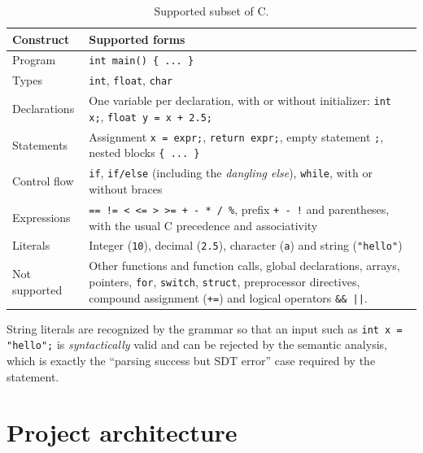 \documentclass[11pt,letterpaper]{article}
\let\oldsection\section
\renewcommand{\section}{\needspace{8\baselineskip}\oldsection}
\begin{document}
\begin{table}[!htbp]
\centering
\caption{Supported subset of C.}
\label{tab:scope}
\begin{tabularx}{\linewidth}{@{}p{3.6cm}X@{}}
\toprule
\textbf{Construct} & \textbf{Supported forms} \\
\midrule
Program      & \texttt{int main() \{ ... \}} \\
Types        & \texttt{int}, \texttt{float}, \texttt{char} \\
Declarations & One variable per declaration, with or without initializer:
               \texttt{int x;}, \texttt{float y = x + 2.5;} \\
Statements   & Assignment \texttt{x = expr;}, \texttt{return expr;}, empty
               statement \texttt{;}, nested blocks \texttt{\{ ... \}} \\
Control flow & \texttt{if}, \texttt{if/else} (including the \emph{dangling
               else}), \texttt{while}, with or without braces \\
Expressions  & \texttt{== != < <= > >= + - * / \%}, prefix \texttt{+ - !} and
               parentheses, with the usual C precedence and associativity \\
Literals     & Integer (\texttt{10}), decimal (\texttt{2.5}), character
               (\texttt{\textquotesingle{}a\textquotesingle{}}) and string (\texttt{"hello"}) \\
\midrule
Not supported & Other functions and function calls, global declarations,
               arrays, pointers, \texttt{for}, \texttt{switch},
               \texttt{struct}, preprocessor directives, compound assignment
               (\texttt{+=}) and logical operators \texttt{\&\& ||}. \\
\bottomrule
\end{tabularx}
\end{table}

String literals are recognized by the grammar so that an input such as
\texttt{int x = "hello";} is \emph{syntactically} valid and can be rejected by
the semantic analysis, which is exactly the ``parsing success but SDT error''
case required by the statement.

\section{Project architecture}
\end{document}
